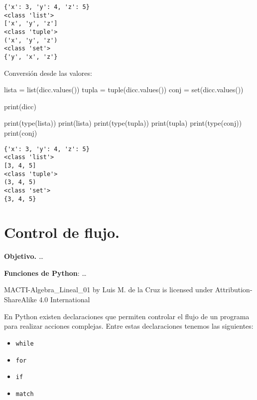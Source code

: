 \documentclass[
  letterpaper,
  DIV=11,
  numbers=noendperiod]{scrreprt}
\newenvironment{Shaded}{\begin{snugshade}}{\end{snugshade}}
\newcommand{\BuiltInTok}[1]{\textcolor[rgb]{0.00,0.23,0.31}{#1}}
\newcommand{\NormalTok}[1]{\textcolor[rgb]{0.00,0.23,0.31}{#1}}
\newcommand{\OperatorTok}[1]{\textcolor[rgb]{0.37,0.37,0.37}{#1}}
\providecommand{\tightlist}{%
  \setlength{\itemsep}{0pt}\setlength{\parskip}{0pt}}\usepackage{longtable,booktabs,array}
\begin{document}
\begin{verbatim}
{'x': 3, 'y': 4, 'z': 5}
<class 'list'>
['x', 'y', 'z']
<class 'tuple'>
('x', 'y', 'z')
<class 'set'>
{'y', 'x', 'z'}
\end{verbatim}

Conversión desde las valores:

\begin{Shaded}
\begin{Highlighting}[]
\NormalTok{lista }\OperatorTok{=} \BuiltInTok{list}\NormalTok{(dicc.values())}
\NormalTok{tupla }\OperatorTok{=} \BuiltInTok{tuple}\NormalTok{(dicc.values())}
\NormalTok{conj }\OperatorTok{=} \BuiltInTok{set}\NormalTok{(dicc.values())}
\end{Highlighting}
\end{Shaded}

\begin{Shaded}
\begin{Highlighting}[]
\BuiltInTok{print}\NormalTok{(dicc)}

\BuiltInTok{print}\NormalTok{(}\BuiltInTok{type}\NormalTok{(lista))}
\BuiltInTok{print}\NormalTok{(lista)}
\BuiltInTok{print}\NormalTok{(}\BuiltInTok{type}\NormalTok{(tupla))}
\BuiltInTok{print}\NormalTok{(tupla)}
\BuiltInTok{print}\NormalTok{(}\BuiltInTok{type}\NormalTok{(conj))}
\BuiltInTok{print}\NormalTok{(conj)}
\end{Highlighting}
\end{Shaded}

\begin{verbatim}
{'x': 3, 'y': 4, 'z': 5}
<class 'list'>
[3, 4, 5]
<class 'tuple'>
(3, 4, 5)
<class 'set'>
{3, 4, 5}
\end{verbatim}


\chapter{Control de flujo.}\label{control-de-flujo.}

\textbf{Objetivo.} \ldots{}

\textbf{Funciones de Python}: \ldots{}

MACTI-Algebra\_Lineal\_01 by Luis M. de la Cruz is licensed under
Attribution-ShareAlike 4.0 International

En Python existen declaraciones que permiten controlar el flujo de un
programa para realizar acciones complejas. Entre estas declaraciones
tenemos las siguientes:

\begin{itemize}
\tightlist
\item
  \texttt{while}
\item
  \texttt{for}
\item
  \texttt{if}
\item
  \texttt{match}
\end{itemize}
\end{document}
